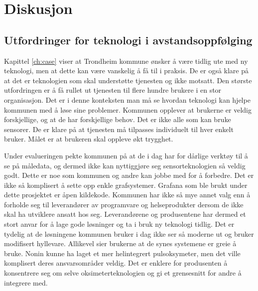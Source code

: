 \chapter{Diskusjon}
\label{ch:discussion}

\section{Utfordringer for teknologi i avstandsoppfølging}
Kapittel \ref{ch:case} viser at Trondheim kommune ønsker å være tidlig ute med ny teknologi, men at dette kan være vanskelig å
få til i praksis. De er også klare på at det er teknologien som skal understøtte tjenesten og ikke motsatt. Den største
utfordringen er å få rullet ut tjenesten til flere hundre brukere i en stor organisasjon. Det er i denne konteksten
man må se hvordan teknologi kan hjelpe kommunen med å løse sine problemer. Kommunen opplever at brukerne er veldig forskjellige, og
at de har forskjellige behov. Det er ikke alle som kan bruke sensorer. De er klare på at tjenesten må tilpasses individuelt til hver
enkelt bruker. Målet er at brukeren skal oppleve økt trygghet.

Under evalueringen pekte kommunen på at de i dag har for dårlige verktøy
til å se på måledata, og dermed ikke kan nyttiggjøre seg sensorteknologien så veldig godt. Dette er noe som kommunen og andre kan jobbe med
for å forbedre. Det er ikke så komplisert å sette opp enkle grafsystemer. Grafana som ble brukt under dette prosjektet er åpen kildekode.
Kommunen har ikke så mye annet valg enn å forholde seg til leverandører av programvare og helseprodukter dersom de
ikke skal ha utviklere ansatt hos seg. Leverandørene og produsentene
har dermed et stort anvar for å lage gode løsninger og ta i bruk ny teknologi tidlig. Det er tydelig at de løsningene kommunen bruker i dag
ikke ser så moderne ut og bruker modifisert hyllevare. Allikevel sier brukerne at de synes systemene er greie å bruke. Nonin kunne ha laget
et mer helintegrert pulsoksymeter, men det ville komplisert deres ansvarsområder veldig. Det er enklere for produsenten å konsentrere seg om
selve oksimeterteknologien og gi et grensesnitt for andre å integrere med.

